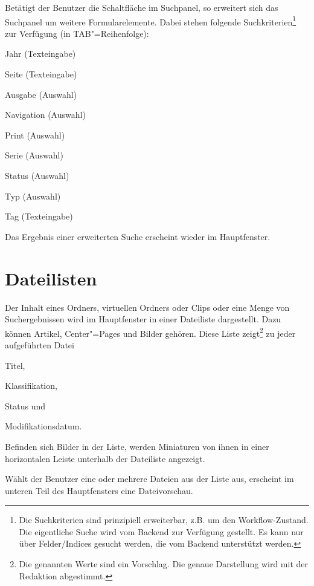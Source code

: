 Betätigt der Benutzer die Schaltfläche  im
Suchpanel, so erweitert sich das Suchpanel um weitere Formularelemente.  Dabei
stehen folgende Suchkriterien\footnote{Die Suchkriterien sind prinzipiell
erweiterbar, z.B. um den Workflow-Zustand. Die eigentliche Suche wird vom
Backend zur Verfügung gestellt. Es kann nur über Felder/Indices gesucht
werden, die vom Backend unterstützt werden.} zur Verfügung (in
TAB"=Reihenfolge):


\begin{compactitem}
  \item Jahr (Texteingabe)
  \item Seite (Texteingabe)
  \item Ausgabe (Auswahl)
  \item Navigation (Auswahl)
  \item Print (Auswahl)
  \item Serie (Auswahl)
  \item Status (Auswahl)
  \item Typ (Auswahl)
  \item Tag (Texteingabe)
\end{compactitem}
%
Das Ergebnis einer erweiterten Suche erscheint wieder im Hauptfenster.

\section{Dateilisten} \label{sec-dateiliste}

Der Inhalt eines Ordners, virtuellen Ordners oder Clips oder eine Menge von
Suchergebnissen wird im Hauptfenster in einer Dateiliste dargestellt. Dazu
können Artikel, Center"=Pages und Bilder gehören. Diese Liste zeigt\footnote{
Die genannten Werte sind ein Vorschlag. Die genaue Darstellung wird mit der
Redaktion abgestimmt.} zu jeder aufgeführten Datei

\begin{compactitem}
  \item Titel,
  \item Klassifikation,
  \item Status und
  \item Modifikationsdatum.
\end{compactitem}

Befinden sich Bilder in der Liste, werden Miniaturen von ihnen in einer
horizontalen Leiste unterhalb der Dateiliste angezeigt.

Wählt der Benutzer eine oder mehrere Dateien aus der Liste aus, erscheint im
unteren Teil des Hauptfensters eine Dateivorschau.

